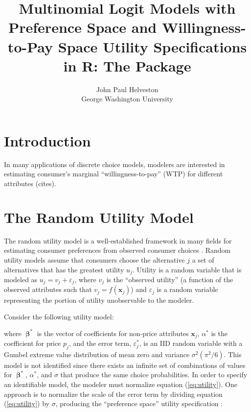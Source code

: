 \documentclass[article]{jss}
\author{
John Paul Helveston\\George Washington University
}
\title{Multinomial Logit Models with Preference Space and Willingness-to-Pay
Space Utility Specifications in R: The \pkg{logitr} Package}
\begin{document}
\newcommand{\betaVec}{\boldsymbol\upbeta}
\newcommand{\omegaVec}{\boldsymbol\upomega}
\newcommand{\zetaVec}{\boldsymbol\upzeta}
\newcommand{\deltaVec}{\boldsymbol\updelta}
\newcommand{\gammaVec}{\boldsymbol\upgamma}
\newcommand{\epsilonVec}{\boldsymbol\upepsilon}
\newcommand{\xVec}{\mathrm{\mathbf{x}}}
\newcommand{\XVec}{\mathrm{\mathbf{X}}}

\hypertarget{introduction}{%
\section{Introduction}\label{introduction}}

In many applications of discrete choice models, modelers are interested
in estimating consumer's marginal ``willingness-to-pay'' (WTP) for
different attributes (cites).

\hypertarget{the-random-utility-model}{%
\section{The Random Utility Model}\label{the-random-utility-model}}

The random utility model is a well-established framework in many fields
for estimating consumer preferences from observed consumer choices
\citep[\citet{Train2009}]{Louviere2000}. Random utility models assume
that consumers choose the alternative \(j\) a set of alternatives that
has the greatest utility \(u_{j}\). Utility is a random variable that is
modeled as \(u_{j} = v_{j} + \varepsilon_{j}\), where \(v_{j}\) is the
``observed utility'' (a function of the observed attributes such that
\(v_{j} = f(\mathrm{\mathbf{x}}_{j})\)) and \(\varepsilon_{j}\) is a
random variable representing the portion of utility unobservable to the
modeler.

Consider the following utility model:



where \(\boldsymbol\upbeta^{*}\) is the vector of coefficients for
non-price attributes \(\mathrm{\mathbf{x}}_{j}\), \(\alpha^{*}\) is the
coefficient for price \(p_{j}\), and the error term,
\(\varepsilon^{*}_{j}\), is an IID random variable with a Gumbel extreme
value distribution of mean zero and variance \(\sigma^2(\pi^2/6)\). This
model is not identified since there exists an infinite set of
combinations of values for \(\boldsymbol\upbeta^{*}\), \(\alpha^{*}\),
and \(\sigma\) that produce the same choice probabilities. In order to
specify an identifiable model, the modeler must normalize equation
(\ref{eq:utility}). One approach is to normalize the scale of the error
term by dividing equation (\ref{eq:utility}) by \(\sigma\), producing
the ``preference space'' utility specification \citep{Train2005}:
\end{document}
